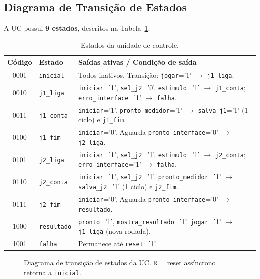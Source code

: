 \documentclass[12pt,a4paper]{article}
\begin{document}
\subsection{Diagrama de Transição de Estados}

A UC possui \textbf{9 estados}, descritos na Tabela~\ref{tab:estados}.

\begin{table}[H]
\centering
\caption{Estados da unidade de controle.}
\label{tab:estados}
\begin{tabularx}{\textwidth}{clX}
\toprule
\textbf{Código} & \textbf{Estado} & \textbf{Saídas ativas / Condição de saída} \\
\midrule
0001 & \texttt{inicial}   &
  Todos inativos. Transição: \texttt{jogar}='1' $\to$ \texttt{j1\_liga}. \\
0010 & \texttt{j1\_liga}  &
  \texttt{iniciar}='1', \texttt{sel\_j2}='0'.
  \texttt{estimulo}='1' $\to$ \texttt{j1\_conta};
  \texttt{erro\_interface}='1' $\to$ \texttt{falha}. \\
0011 & \texttt{j1\_conta} &
  \texttt{iniciar}='1'. \texttt{pronto\_medidor}='1' $\to$
  \texttt{salva\_j1}='1' (1 ciclo) e \texttt{j1\_fim}. \\
0100 & \texttt{j1\_fim}   &
  \texttt{iniciar}='0'. Aguarda \texttt{pronto\_interface}='0'
  $\to$ \texttt{j2\_liga}. \\
0101 & \texttt{j2\_liga}  &
  \texttt{iniciar}='1', \texttt{sel\_j2}='1'.
  \texttt{estimulo}='1' $\to$ \texttt{j2\_conta};
  \texttt{erro\_interface}='1' $\to$ \texttt{falha}. \\
0110 & \texttt{j2\_conta} &
  \texttt{iniciar}='1', \texttt{sel\_j2}='1'. \texttt{pronto\_medidor}='1'
  $\to$ \texttt{salva\_j2}='1' (1 ciclo) e \texttt{j2\_fim}. \\
0111 & \texttt{j2\_fim}   &
  \texttt{iniciar}='0'. Aguarda \texttt{pronto\_interface}='0'
  $\to$ \texttt{resultado}. \\
1000 & \texttt{resultado} &
  \texttt{pronto}='1', \texttt{mostra\_resultado}='1'.
  \texttt{jogar}='1' $\to$ \texttt{j1\_liga} (nova rodada). \\
1001 & \texttt{falha}     &
  Permanece até \texttt{reset}='1'. \\
\bottomrule
\end{tabularx}
\end{table}

\begin{figure}[H]
  \centering
  \caption{Diagrama de transição de estados da UC\@.
    \texttt{R} = reset assíncrono retorna a \texttt{inicial}.}
  \label{fig:estados}
\end{figure}
\end{document}
